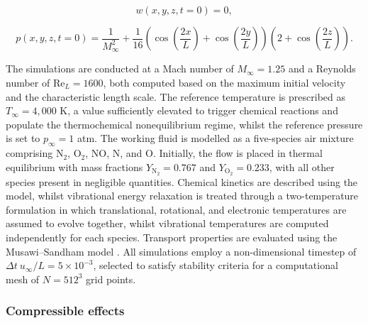 \begin{equation}
w(x,y,z,t=0) = 0,
\end{equation}

\begin{equation}
p(x,y,z,t=0) = \frac{1}{M_{\infty}^2} + \frac{1}{16}\left(\cos\left(\frac{2x}{L}\right) + \cos\left(\frac{2y}{L}\right)\right)\left(2 + \cos\left(\frac{2z}{L}\right)\right).
\end{equation}

The simulations are conducted at a Mach number of $M_{\infty} = 1.25$ and a Reynolds number of $\text{Re}_{L} = 1600$, both computed based on the maximum initial velocity and the characteristic length scale. The reference temperature is prescribed as $T_{\infty} = 4,000$ K, a value sufficiently elevated to trigger chemical reactions and populate the thermochemical nonequilibrium regime, whilst the reference pressure is set to $p_{\infty} = 1$ atm. The working fluid is modelled as a five-species air mixture comprising N$_2$, O$_2$, NO, N, and O. Initially, the flow is placed in thermal equilibrium with mass fractions $Y_{\text{N}_2} = 0.767$ and $Y_{\text{O}_2} = 0.233$, with all other species present in negligible quantities. Chemical kinetics are described using the \citep{Park1990} model, whilst vibrational energy relaxation is treated through a two-temperature formulation in which translational, rotational, and electronic temperatures are assumed to evolve together, whilst vibrational temperatures are computed independently for each species. Transport properties are evaluated using the Musawi--Sandham model \citep{Musawi2025}. All simulations employ a non-dimensional timestep of $\Delta t \ u_{\infty}/L = 5 \times 10^{-3}$, selected to satisfy stability criteria for a computational mesh of $N = 512^3$ grid points.

\subsubsection{Compressible effects}

